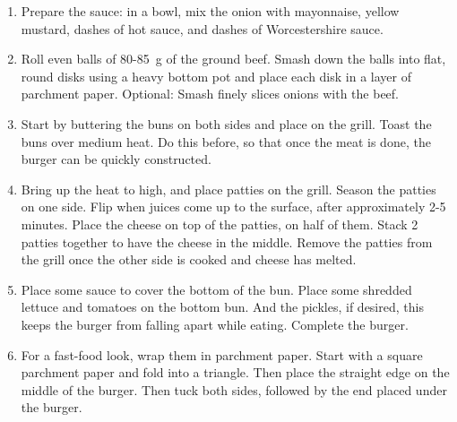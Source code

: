\begin{enumerate}
    \item Prepare the sauce: in a bowl, mix the onion with mayonnaise, yellow mustard, dashes of hot sauce, and dashes of Worcestershire sauce.
    \item Roll even balls of 80-85~g of the ground beef. Smash down the balls into flat, round disks using a heavy bottom pot and place each disk in a layer of parchment paper. Optional: Smash finely slices onions with the beef.
    \item Start by buttering the buns on both sides and place on the grill. Toast the buns over medium heat. Do this before, so that once the meat is done, the burger can be quickly constructed.
    \item Bring up the heat to high, and place patties on the grill. Season the patties on one side. Flip when juices come up to the surface, after approximately 2-5 minutes. Place the cheese on top of the patties, on half of them. Stack 2 patties together to have the cheese in the middle. Remove the patties from the grill once the other side is cooked and cheese has melted.
    \item Place some sauce to cover the bottom of the bun. Place some shredded lettuce and tomatoes on the bottom bun. And the pickles, if desired, this keeps the burger from falling apart while eating.
    Complete the burger.
    \item For a fast-food look, wrap them in parchment paper. Start with a square parchment paper and fold into a triangle. Then place the straight edge on the middle of the burger. Then tuck both sides, followed by the end placed under the burger.
\end{enumerate}

